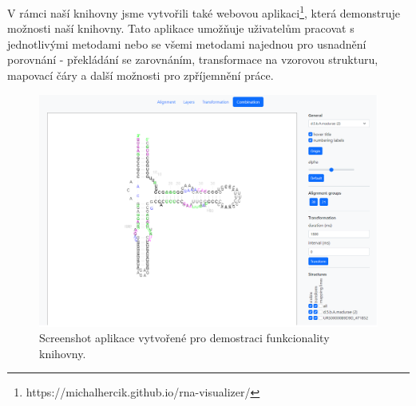 V rámci naší knihovny jsme vytvořili také webovou
aplikaci\footnote{https://michalhercik.github.io/rna-visualizer/}, která
demonstruje možnosti naší knihovny. Tato aplikace umožňuje uživatelům pracovat
s jednotlivými metodami nebo se všemi metodami najednou pro usnadnění porovnání
- překládání se zarovnáním, transformace na vzorovou strukturu, mapovací čáry a
další možnosti pro zpříjemnění práce. 

\begin{figure}[H]
  \centering
  \includegraphics[width=145mm]{../img/kap03/demo.png}
  \caption{Screenshot aplikace vytvořené pro demostraci funkcionality knihovny.}
\end{figure}
